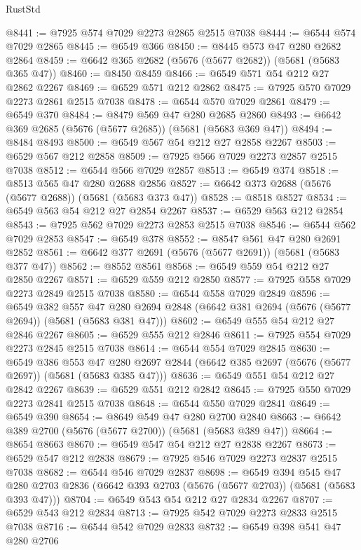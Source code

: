 \begin{lexlean}{RustStd}
\begin{coremodule}
@8441 := @7925 @574 @7029 @2273 @2865 @2515 @7038
@8444 := @6544 @574 @7029 @2865
@8445 := @6549 @366
@8450 := @8445 @573 @47 @280 @2682 @2864
@8459 := @6642 @365 @2682 (@5676 (@5677 @2682)) (@5681 (@5683 @365 @47))
@8460 := @8450 @8459
@8466 := @6549 @571 @54 @212 @27 @2862 @2267
@8469 := @6529 @571 @212 @2862
@8475 := @7925 @570 @7029 @2273 @2861 @2515 @7038
@8478 := @6544 @570 @7029 @2861
@8479 := @6549 @370
@8484 := @8479 @569 @47 @280 @2685 @2860
@8493 := @6642 @369 @2685 (@5676 (@5677 @2685)) (@5681 (@5683 @369 @47))
@8494 := @8484 @8493
@8500 := @6549 @567 @54 @212 @27 @2858 @2267
@8503 := @6529 @567 @212 @2858
@8509 := @7925 @566 @7029 @2273 @2857 @2515 @7038
@8512 := @6544 @566 @7029 @2857
@8513 := @6549 @374
@8518 := @8513 @565 @47 @280 @2688 @2856
@8527 := @6642 @373 @2688 (@5676 (@5677 @2688)) (@5681 (@5683 @373 @47))
@8528 := @8518 @8527
@8534 := @6549 @563 @54 @212 @27 @2854 @2267
@8537 := @6529 @563 @212 @2854
@8543 := @7925 @562 @7029 @2273 @2853 @2515 @7038
@8546 := @6544 @562 @7029 @2853
@8547 := @6549 @378
@8552 := @8547 @561 @47 @280 @2691 @2852
@8561 := @6642 @377 @2691 (@5676 (@5677 @2691)) (@5681 (@5683 @377 @47))
@8562 := @8552 @8561
@8568 := @6549 @559 @54 @212 @27 @2850 @2267
@8571 := @6529 @559 @212 @2850
@8577 := @7925 @558 @7029 @2273 @2849 @2515 @7038
@8580 := @6544 @558 @7029 @2849
@8596 := @6549
    @382
    @557
    @47
    @280
    @2694
    @2848
    (@6642 @381 @2694 (@5676 (@5677 @2694)) (@5681 (@5683 @381 @47)))
@8602 := @6549 @555 @54 @212 @27 @2846 @2267
@8605 := @6529 @555 @212 @2846
@8611 := @7925 @554 @7029 @2273 @2845 @2515 @7038
@8614 := @6544 @554 @7029 @2845
@8630 := @6549
    @386
    @553
    @47
    @280
    @2697
    @2844
    (@6642 @385 @2697 (@5676 (@5677 @2697)) (@5681 (@5683 @385 @47)))
@8636 := @6549 @551 @54 @212 @27 @2842 @2267
@8639 := @6529 @551 @212 @2842
@8645 := @7925 @550 @7029 @2273 @2841 @2515 @7038
@8648 := @6544 @550 @7029 @2841
@8649 := @6549 @390
@8654 := @8649 @549 @47 @280 @2700 @2840
@8663 := @6642 @389 @2700 (@5676 (@5677 @2700)) (@5681 (@5683 @389 @47))
@8664 := @8654 @8663
@8670 := @6549 @547 @54 @212 @27 @2838 @2267
@8673 := @6529 @547 @212 @2838
@8679 := @7925 @546 @7029 @2273 @2837 @2515 @7038
@8682 := @6544 @546 @7029 @2837
@8698 := @6549
    @394
    @545
    @47
    @280
    @2703
    @2836
    (@6642 @393 @2703 (@5676 (@5677 @2703)) (@5681 (@5683 @393 @47)))
@8704 := @6549 @543 @54 @212 @27 @2834 @2267
@8707 := @6529 @543 @212 @2834
@8713 := @7925 @542 @7029 @2273 @2833 @2515 @7038
@8716 := @6544 @542 @7029 @2833
@8732 := @6549
    @398
    @541
    @47
    @280
    @2706

\end{coremodule}
\end{lexlean}
